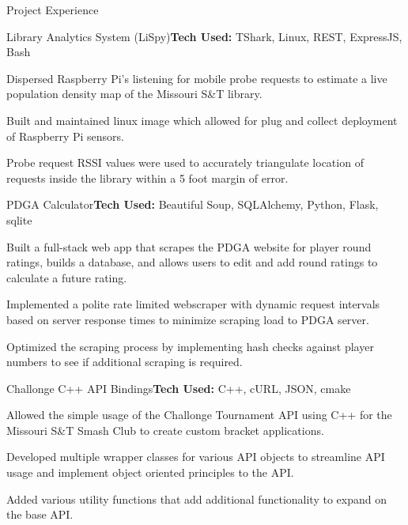 \documentclass{resume}
\begin{document}
\begin{rSection}{Project Experience}
    \begin{rSubsection}{Library Analytics System (LiSpy)}{}{\textbf{Tech Used:} TShark, Linux, REST, ExpressJS, Bash}{} 
        \item Dispersed Raspberry Pi's listening for mobile probe requests to estimate a live population density map of the Missouri S\&T library. 
        \item Built and maintained linux image which allowed for plug and collect deployment of Raspberry Pi sensors.
        \item Probe request RSSI values were used to accurately triangulate location of requests inside the library within a 5 foot margin of error. 
    \end{rSubsection}

    \begin{rSubsection}{PDGA Calculator}{}{\textbf{Tech Used:} Beautiful Soup, SQLAlchemy, Python, Flask, sqlite}{} 
        \item Built a full-stack web app that scrapes the PDGA website for player round ratings, builds a database, and allows users to edit and add round ratings to calculate a future rating.
        \item Implemented a polite rate limited webscraper with dynamic request intervals based on server response times to minimize scraping load to PDGA server.
        \item Optimized the scraping process by implementing hash checks against player numbers to see if additional scraping is required.
    \end{rSubsection}

    \begin{rSubsection}{Challonge C++ API Bindings}{}{\textbf{Tech Used:} C++, cURL, JSON, cmake}{} 
        \item Allowed the simple usage of the Challonge Tournament API using C++ for the Missouri S\&T Smash Club to create custom bracket applications.
        \item Developed multiple wrapper classes for various API objects to streamline API usage and implement object oriented principles to the API. 
        \item Added various utility functions that add additional functionality to expand on the base API. 
    \end{rSubsection}
\end{rSection}
\end{document}
